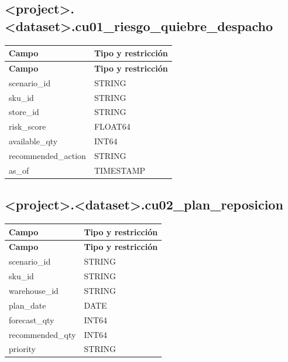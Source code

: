 \documentclass[11pt]{article}
\begin{document}
\subsection{<project>.<dataset>.cu01\_\allowbreak{}riesgo\_\allowbreak{}quiebre\_\allowbreak{}despacho}

\begingroup\small
\begin{longtable}{@{}>{\raggedright\arraybackslash}p{}>{\raggedright\arraybackslash}p{}@{}}
\toprule
\textbf{Campo} & \textbf{Tipo y restricción} \\
\midrule
\endfirsthead
\toprule
\textbf{Campo} & \textbf{Tipo y restricción} \\
\midrule
\endhead
scenario\_\allowbreak{}id & STRING \\
sku\_\allowbreak{}id & STRING \\
store\_\allowbreak{}id & STRING \\
risk\_\allowbreak{}score & FLOAT64 \\
available\_\allowbreak{}qty & INT64 \\
recommended\_\allowbreak{}action & STRING \\
as\_\allowbreak{}of & TIMESTAMP \\
\bottomrule
\end{longtable}
\endgroup

\subsection{<project>.<dataset>.cu02\_\allowbreak{}plan\_\allowbreak{}reposicion}

\begingroup\small
\begin{longtable}{@{}>{\raggedright\arraybackslash}p{}>{\raggedright\arraybackslash}p{}@{}}
\toprule
\textbf{Campo} & \textbf{Tipo y restricción} \\
\midrule
\endfirsthead
\toprule
\textbf{Campo} & \textbf{Tipo y restricción} \\
\midrule
\endhead
scenario\_\allowbreak{}id & STRING \\
sku\_\allowbreak{}id & STRING \\
warehouse\_\allowbreak{}id & STRING \\
plan\_\allowbreak{}date & DATE \\
forecast\_\allowbreak{}qty & INT64 \\
recommended\_\allowbreak{}qty & INT64 \\
priority & STRING \\
\bottomrule
\end{longtable}
\endgroup
\end{document}
